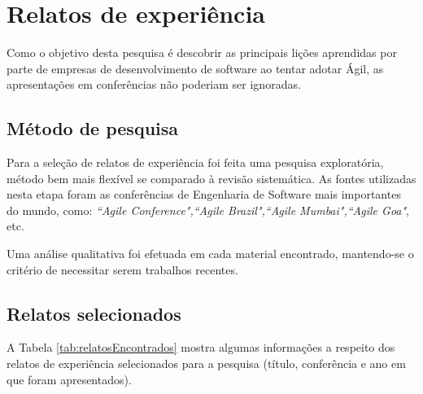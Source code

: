 %
%

\section{Relatos de experiência}

Como o objetivo desta pesquisa é descobrir as principais lições aprendidas por parte de empresas de desenvolvimento de software ao tentar adotar Ágil, as apresentações em conferências não poderiam ser ignoradas.

\subsection{Método de pesquisa}

Para a seleção de relatos de experiência foi feita uma pesquisa exploratória, método bem mais flexível se comparado à revisão sistemática. As fontes utilizadas nesta etapa foram as conferências de Engenharia de Software mais importantes do mundo, como: \textit{``Agile Conference",``Agile Brazil",``Agile Mumbai",``Agile Goa"}, etc.

Uma análise qualitativa foi efetuada em cada material encontrado, mantendo-se o critério de necessitar serem trabalhos recentes.

\subsection{Relatos selecionados}

A Tabela \ref{tab:relatosEncontrados} mostra algumas informações a respeito dos relatos de experiência selecionados para a pesquisa (título, conferência e ano em que foram apresentados).

